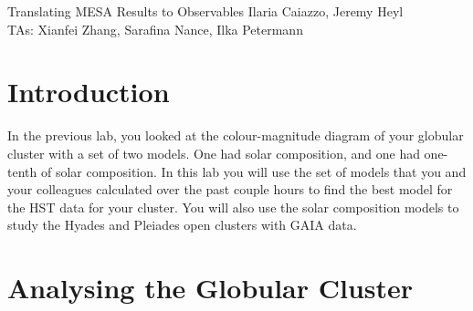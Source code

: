 \documentclass{article}
\begin{document}
\begin{titlebox}{Translating MESA Results to Observables}
Ilaria Caiazzo, Jeremy Heyl \\
TAs: Xianfei Zhang, Sarafina Nance, Ilka Petermann
\end{titlebox}

\section{Introduction}

In the previous lab, you looked at the colour-magnitude diagram of your globular cluster with a set of two models.  One had solar composition, and one had  one-tenth of solar composition.  In this lab you will use the set of models that you and your colleagues calculated over the past couple hours to find the best model for the HST data for your cluster.  You will also use the solar composition models to study the Hyades and Pleiades open clusters with GAIA data.

\section{Analysing the Globular Cluster}
\end{document}
